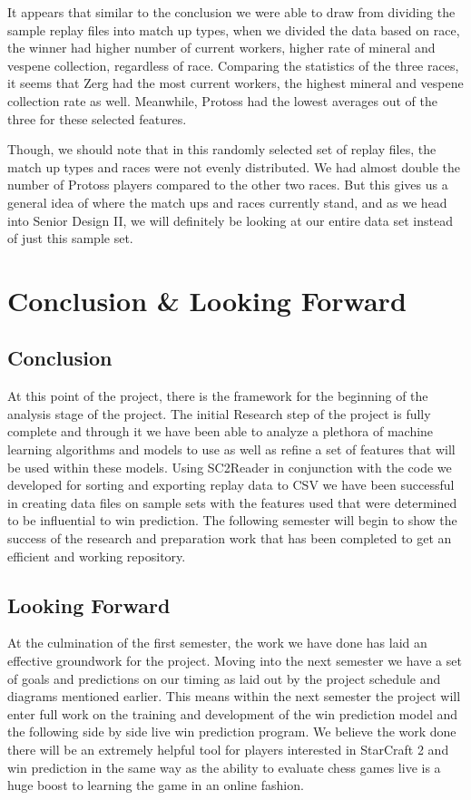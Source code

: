 \documentclass[a4paper,12pt]{report}
\begin{document}
It appears that similar to the conclusion we were able to draw from dividing the sample replay files into match up types, when we divided the data based on race, the winner had higher number of current workers, higher rate of mineral and vespene collection, regardless of race. Comparing the statistics of the three races, it seems that Zerg had the most current workers, the highest mineral and vespene collection rate as well. Meanwhile, Protoss had the lowest averages out of the three for these selected features.

Though, we should note that in this randomly selected set of replay files, the match up types and races were not evenly distributed. We had almost double the number of Protoss players compared to the other two races. But this gives us a general idea of where the match ups and races currently stand, and as we head into Senior Design II, we will definitely be looking at our entire data set instead of just this sample set.

\chapter{Conclusion \& Looking Forward}

\section{Conclusion}
At this point of the project, there is the framework for the beginning of the analysis stage of the project. The initial Research step of the project is fully complete and through it we have been able to analyze a plethora of machine learning algorithms and models to use as well as refine a set of features that will be used within these models. Using SC2Reader in conjunction with the code we developed for sorting and exporting replay data to CSV we have been successful in creating data files on sample sets with the features used that were determined to be influential to win prediction. The following semester will begin to show the success of the research and preparation work that has been completed to get an efficient and working repository.

\section{Looking Forward}
At the culmination of the first semester, the work we have done has laid an effective groundwork for the project. Moving into the next semester we have a set of goals and predictions on our timing as laid out by the project schedule and diagrams mentioned earlier. This means within the next semester the project will enter full work on the training and development of the win prediction model and the following side by side live win prediction program. We believe the work done there will be an extremely helpful tool for players interested in StarCraft 2 and win prediction in the same way as the ability to evaluate chess games live is a huge boost to learning the game in an online fashion.
\end{document}
